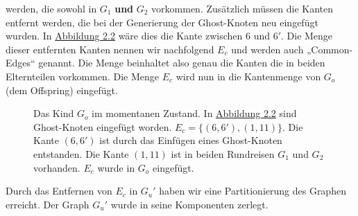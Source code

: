werden, die sowohl in $G_1$ \textbf{und} $G_2$ vorkommen. Zusätzlich
müssen die Kanten entfernt werden, die bei der Generierung der
Ghost-Knoten neu eingefügt wurden. In \hyperref[fig:ghostnodes]{Abbildung 2.2} wäre dies die Kante
zwischen $6$ und $6'$. Die Menge dieser entfernten Kanten nennen wir
nachfolgend $E_c$ und werden auch „Common-Edges“ genannt. Die Menge
beinhaltet also genau die Kanten die in beiden Elternteilen vorkommen. Die
Menge $E_c$ wird nun in die Kantenmenge von $G_o$ (dem Offspring)
eingefügt.
\begin{figure}[hb]
  \label{fig:offspring_1}
\centering
{}
  \caption[Kind $G_o$ nach Einfügen der gemeinsamen Kantenmenge $E_c$]
  {Das Kind $G_o$ im momentanen Zustand. In
  \hyperref[fig:ghostnodes]{Abbildung 2.2} sind Ghost-Knoten eingefügt
  worden. $E_c = \{(6,6'),(1,11)\}$. Die Kante $(6,6')$ ist durch das
  Einfügen eines Ghost-Knoten entstanden. Die Kante $(1,11)$ ist in beiden
  Rundreisen $G_1$ und $G_2$ vorhanden. $E_c$ wurde in $G_o$ eingefügt.}
\end{figure}
\newpage
Durch das Entfernen von $E_c$ in $G_u'$ haben wir eine Partitionierung
des Graphen erreicht. Der Graph $G_u'$ wurde in seine Komponenten
zerlegt.

